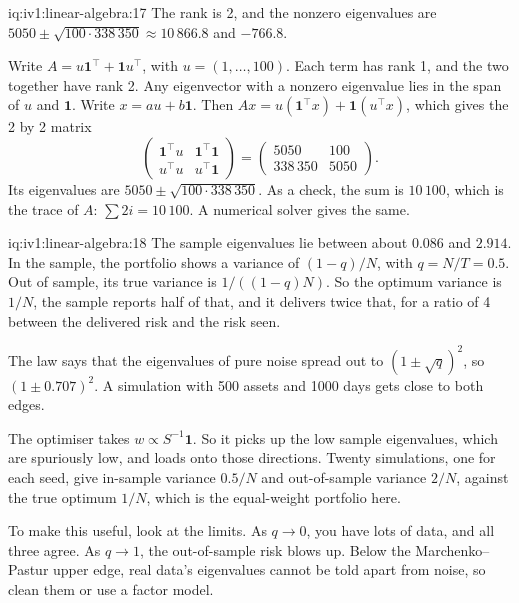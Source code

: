 \begin{solution}{iq:iv1:linear-algebra:17}
The rank is 2, and the nonzero eigenvalues are $5050 \pm \sqrt{100 \cdot 338\,350} \approx 10\,866.8$ and $-766.8$.

Write $A = u\mathbf{1}^\top + \mathbf{1}u^\top$, with $u = (1, \dots, 100)$. Each term has rank 1, and the two together have rank 2. Any eigenvector with a nonzero eigenvalue lies in the span of $u$ and $\mathbf{1}$. Write $x = au + b\mathbf{1}$. Then $Ax = u(\mathbf{1}^\top x) + \mathbf{1}(u^\top x)$, which gives the 2 by 2 matrix
\[
\begin{pmatrix} \mathbf{1}^\top u & \mathbf{1}^\top\mathbf{1} \\ u^\top u & u^\top\mathbf{1} \end{pmatrix} = \begin{pmatrix} 5050 & 100 \\ 338\,350 & 5050 \end{pmatrix}.
\]
Its eigenvalues are $5050 \pm \sqrt{100 \cdot 338\,350}$. As a check, the sum is $10\,100$, which is the trace of $A$: $\sum 2i = 10\,100$. A numerical solver gives the same.

\end{solution}

\begin{solution}{iq:iv1:linear-algebra:18}
The sample eigenvalues lie between about $0.086$ and $2.914$. In the sample, the portfolio shows a variance of $(1 - q)/N$, with $q = N/T = 0.5$. Out of sample, its true variance is $1/((1 - q)N)$. So the optimum variance is $1/N$, the sample reports half of that, and it delivers twice that, for a ratio of 4 between the delivered risk and the risk seen.

The law says that the eigenvalues of pure noise spread out to $(1 \pm \sqrt{q})^2$, so $(1 \pm 0.707)^2$. A simulation with 500 assets and 1000 days gets close to both edges.

The optimiser takes $w \propto S^{-1}\mathbf{1}$. So it picks up the low sample eigenvalues, which are spuriously low, and loads onto those directions. Twenty simulations, one for each seed, give in-sample variance $0.5/N$ and out-of-sample variance $2/N$, against the true optimum $1/N$, which is the equal-weight portfolio here.

To make this useful, look at the limits. As $q \to 0$, you have lots of data, and all three agree. As $q \to 1$, the out-of-sample risk blows up. Below the Marchenko--Pastur upper edge, real data's eigenvalues cannot be told apart from noise, so clean them or use a factor model.

\end{solution}


